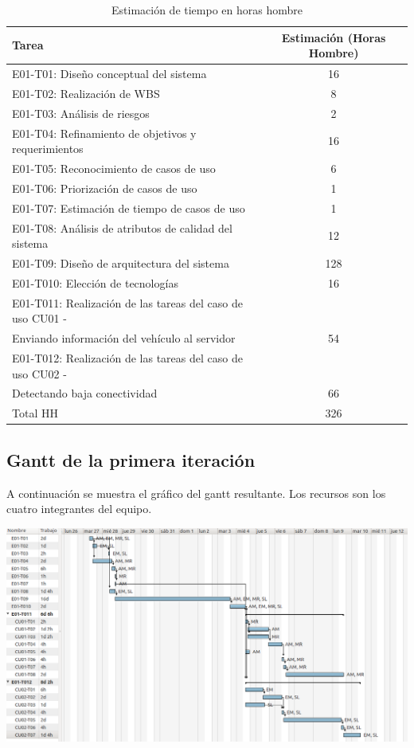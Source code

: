\begin{table}[htb]
\begin{center}
\begin{tabular}{|l|c|}
\hline
Tarea & Estimación (Horas Hombre) \\
\hline \hline
E01-T01: Diseño conceptual del sistema & 16 \\ \hline
E01-T02: Realización de WBS & 8 \\ \hline
E01-T03: Análisis de riesgos & 2 \\ \hline
E01-T04: Refinamiento de objetivos y requerimientos & 16 \\ \hline
E01-T05: Reconocimiento de casos de uso & 6 \\ \hline
E01-T06: Priorización de casos de uso & 1 \\ \hline
E01-T07: Estimación de tiempo de casos de uso & 1 \\ \hline
E01-T08: Análisis de atributos de calidad del sistema & 12 \\ \hline
E01-T09: Diseño de arquitectura del sistema & 128 \\ \hline
E01-T010: Elección de tecnologías & 16 \\ \hline
E01-T011: Realización de las tareas del caso de uso CU01 - \\ Enviando información del vehículo al servidor & 54 \\ \hline
E01-T012: Realización de las tareas del caso de uso CU02 - \\ Detectando baja conectividad & 66 \\ \hline \hline
Total HH & 326 \\ \hline
\end{tabular}
\caption{Estimación de tiempo en horas hombre}
\end{center}
\end{table}


\subsection{Gantt de la primera iteración}

A continuación se muestra el gráfico del gantt resultante.
Los recursos son los cuatro integrantes del equipo.
\newline

\centerline{\includegraphics[width=1\textwidth]{./imagenes/gantt.png}}
